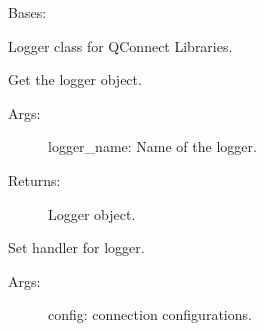 \documentclass[letterpaper,10pt,english]{sphinxmanual}
\begin{document}

\begin{fulllineitems}
\label{\detokenize{QConnectBase:QConnectBase.qlogger.QLogger}}
\sphinxAtStartPar
Bases: 

\sphinxAtStartPar
Logger class for QConnect Libraries.

\begin{fulllineitems}
\label{\detokenize{QConnectBase:QConnectBase.qlogger.QLogger.NAME_2_LEVEL_DICT}}
\end{fulllineitems}


\begin{fulllineitems}
\label{\detokenize{QConnectBase:QConnectBase.qlogger.QLogger.get_logger}}
\sphinxAtStartPar
Get the logger object.
\begin{description}
\item[{Args:}] \leavevmode
\sphinxAtStartPar
logger\_name: Name of the logger.

\item[{Returns:}] \leavevmode
\sphinxAtStartPar
Logger object.

\end{description}

\end{fulllineitems}


\begin{fulllineitems}
\label{\detokenize{QConnectBase:QConnectBase.qlogger.QLogger.set_handler}}
\sphinxAtStartPar
Set handler for logger.
\begin{description}
\item[{Args:}] \leavevmode
\sphinxAtStartPar
config: connection configurations.


\end{description}
\end{fulllineitems}
\end{fulllineitems}
\end{document}

